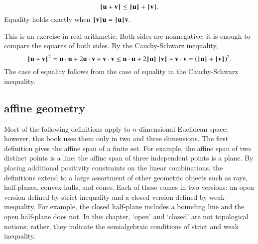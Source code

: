 \begin{lemma}
\label{lemma:triangle-ineq}
\begin{displaymath}
\normo{\u + \v} \le \normo{\u} + \normo{\v }.
\end{displaymath}
Equality holds exactly when $\normo{\v}\u = \normo{\u}\v$.
\end{lemma}
%

\begin{proved}  This is an exercise in real arithmetic.
Both sides are nonnegative; it is enough to compare the squares of
both sides.  By the Cauchy-Schwarz inequality,
\begin{displaymath}\normo{\u + \v}^2 = \u\cdot \u + 2 \u\cdot \v + \v\cdot \v \le
  \u\cdot \u + 2 \normo{ \u}\,\normo{\v} + \v\cdot \v = (\normo{\u}+\normo{\v})^2.
\end{displaymath}
The case of equality follows from the case of equality in the
Cauchy-Schwarz inequality.
\swallowed\end{proved}



\subsection{affine geometry}




\begin{summary}Most of the following definitions apply to
  $n$-dimensional Euclidean space; however, this book uses them only
  in two and three dimensions.  The first definition gives the affine
  span of a finite set.  For example, the affine span of two distinct
  points is a line; the affine span of three independent points is a
  plane.  By placing additional positivity constraints on the linear
  combinations, the definitions extend to a large assortment of other
  geometric objects such as rays, half-planes, convex hulls, and
  cones.  Each of these comes in two versions: an open version defined
  by strict inequality and a closed version defined by weak
  inequality.  For example, the closed half-plane includes a bounding
  line and the open half-plane does not.  In this chapter, `open' and
  `closed' are not topological notions; rather, they indicate the
  semialgebraic conditions of strict and weak inequality.
\end{summary}

